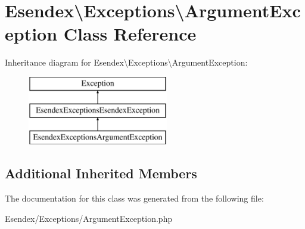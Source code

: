 \section{Esendex\textbackslash{}Exceptions\textbackslash{}Argument\-Exception Class Reference}
\label{class_esendex_1_1_exceptions_1_1_argument_exception}
Inheritance diagram for Esendex\textbackslash{}Exceptions\textbackslash{}Argument\-Exception\-:\begin{figure}[H]
\begin{center}
\leavevmode
\includegraphics[height=3.000000cm]{class_esendex_1_1_exceptions_1_1_argument_exception}
\end{center}
\end{figure}
\subsection*{Additional Inherited Members}


The documentation for this class was generated from the following file\-:\begin{DoxyCompactItemize}
\item 
Esendex/\-Exceptions/Argument\-Exception.\-php\end{DoxyCompactItemize}
